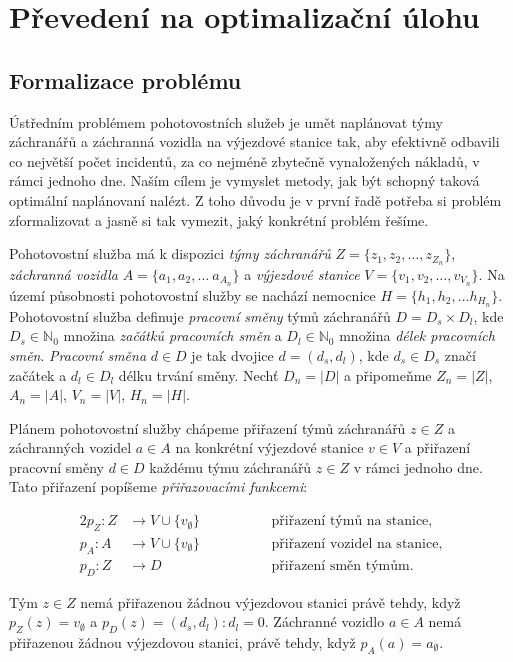 \chapter{Převedení na optimalizační úlohu}

\section{Formalizace problému}

Ústředním problémem pohotovostních služeb je umět naplánovat týmy záchranářů a záchranná vozidla na výjezdové stanice tak, aby efektivně odbavili co největší počet incidentů,
za co nejméně zbytečně vynaložených nákladů, v rámci jednoho dne.
Naším cílem je vymyslet metody, jak být schopný taková optimální naplánovaní nalézt.
Z toho důvodu je v první řadě potřeba si problém zformalizovat a jasně si tak vymezit, jaký konkrétní problém řešíme.

Pohotovostní služba má k dispozici \textit{týmy záchranářů} $Z = \{ z_1, z_2, \dots, z_{Z_n} \}$, \textit{záchranná vozidla} $A = \{ a_1, a_2, \dots\ a_{A_n} \}$
a \textit{výjezdové stanice} $V = \{ v_1, v_2, \dots, v_{V_n} \}$. 
Na území působnosti pohotovostní služby se nachází nemocnice $H = \{ h_1, h_2, \dots h_{H_n} \}$.
Pohotovostní služba definuje \textit{pracovní směny} týmů záchranářů $D = D_{s} \times D_{l}$, 
kde $D_{s} \in \mathbb{N}_0$ množina \textit{začátků pracovních směn} a $D_{l} \in \mathbb{N}_0$ množina \textit{délek pracovních směn}.
\textit{Pracovní směna} $d \in D$ je tak dvojice $d = (d_s, d_l)$, kde $d_{s} \in D_{s}$ značí začátek a $d_{l} \in D_{l}$ délku trvání směny.
Nechť $D_n = |D|$ a připomeňme $Z_n = |Z|$,  $A_n = |A|$,  $V_n = |V|$, $H_n = |H|$.

Plánem pohotovostní služby chápeme přiřazení týmů záchranářů $z \in Z$ a záchranných vozidel $a \in A$ na konkrétní výjezdové stanice $v \in V$
a přiřazení pracovní směny $d \in D$ každému týmu záchranářů $z \in Z$ v rámci jednoho dne.
Tato přiřazení popíšeme \textit{přiřazovacími funkcemi}:
\begin{definice}
  \begin{alignat*}{2}
    p_Z \colon Z &\rightarrow V \cup \{ v_{\emptyset} \} \quad && \hspace{30pt} \text{přiřazení týmů na stanice}, \\
    p_A \colon A &\rightarrow V \cup \{ v_{\emptyset} \} \quad && \hspace{30pt} \text{přiřazení vozidel na stanice}, \\ 
    p_{D} \colon Z &\rightarrow D                        \quad && \hspace{30pt} \text{přiřazení směn týmům}.
  \end{alignat*}
\end{definice}
Tým $z \in Z$ nemá přiřazenou žádnou výjezdovou stanici právě tehdy, když
$p_{Z}(z) = v_{\emptyset}$ a $p_{D}(z) = (d_s, d_l) \colon d_l = 0$.
Záchranné vozidlo $a \in A$ nemá přiřazenou žádnou výjezdovou stanici, právě tehdy, když $p_{A}(a) = a_{\emptyset}$.

